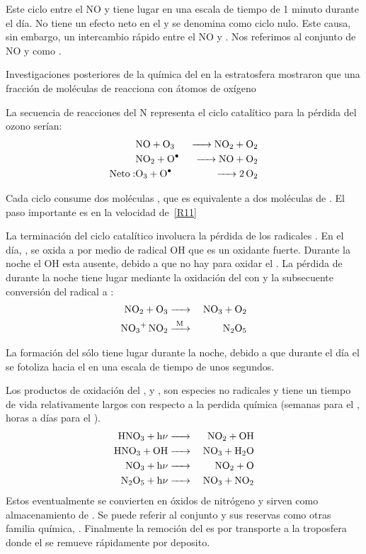 Este ciclo entre el NO y  tiene lugar en una escala de tiempo de 1 minuto durante el día. No tiene un efecto neto en el  y se denomina como ciclo nulo. Este causa, sin embargo, un intercambio rápido entre el NO y . Nos referimos al conjunto de NO y  como .

Investigaciones posteriores de la química del  en la estratosfera mostraron que una fracción de moléculas de  reacciona con átomos de oxígeno 


La secuencia de reacciones del N representa el ciclo catalítico para la pérdida del ozono  serían:
\begin{eqnarray}
            & \ce{NO + O3     &->   NO2 + O2} \label{R10} \\
            &\ce{NO2 +  O^.   & ->   NO + O2 } \label{R11} \\
  \mathrm{Neto: } &\ce{O3 + O^.  &->  2O2}\nonumber 
\end{eqnarray}

Cada ciclo consume dos moléculas  , que es equivalente a dos moléculas de . El paso importante es en la velocidad de~\ref{R11}

La terminación del ciclo catalítico involucra la pérdida de los radicales . En el día,  , se oxida a   por medio de radical OH que es un oxidante fuerte.
Durante la noche el OH esta ausente, debido a que no hay  para oxidar el . La pérdida de   durante la noche tiene lugar mediante la oxidación del  con  y la subsecuente conversión del radical  a :
\begin{eqnarray*}
 \ce{NO2 + O3    & ->       & NO3 + O2 \\
       NO3+ NO2  &  ->[M] & N2O5}
\end{eqnarray*}

La formación del  sólo tiene lugar durante la noche, debido a que durante el día el  se fotoliza hacia el  en una escala de tiempo de unos segundos.

Los productos de oxidación del ,  y , son especies no radicales y tiene un tiempo de vida relativamente largos con respecto a la perdida química (semanas para el , horas a días para el ). 
\begin{eqnarray*}
 \ce{HNO3 + h$\nu$   & ->   & NO2 + OH \\
       HNO3 + OH        &  ->  & NO3 + H2O\\
       NO3  + h$\nu$    & ->   & NO2 + O\\
       N2O5 + h$\nu$   & ->   & NO3 + NO2}
\end{eqnarray*}
Estos eventualmente se convierten en óxidos de nitrógeno  
y sirven como almacenamiento de . Se puede referir al conjunto  y sus reservas como otras familia química, . Finalmente la remoción del  es por transporte a la troposfera donde el  se remueve rápidamente por deposito.

